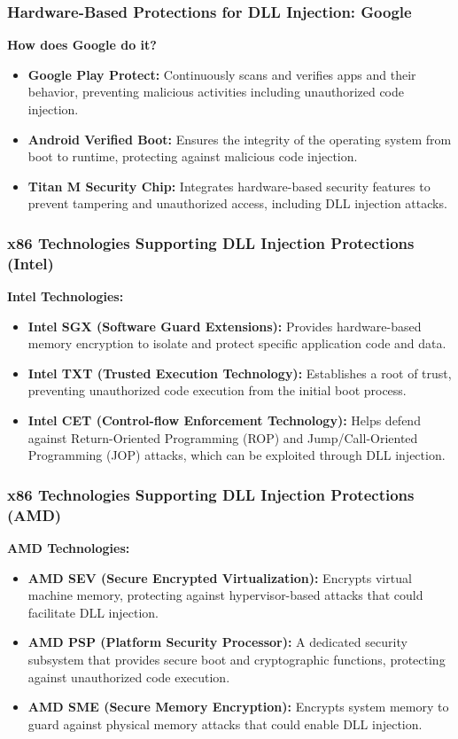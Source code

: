 \begin{frame}
    \frametitle{Hardware-Based Protections for DLL Injection: Google}
    \textbf{How does Google do it?}
    \begin{itemize}
        \item \textbf{Google Play Protect:} Continuously scans and verifies apps and their behavior, preventing malicious activities including unauthorized code injection.
        \item \textbf{Android Verified Boot:} Ensures the integrity of the operating system from boot to runtime, protecting against malicious code injection.
        \item \textbf{Titan M Security Chip:} Integrates hardware-based security features to prevent tampering and unauthorized access, including DLL injection attacks.
    \end{itemize}
\end{frame}

\begin{frame}
    \frametitle{x86 Technologies Supporting DLL Injection Protections (Intel)}
    \textbf{Intel Technologies:}
    \begin{itemize}
        \item \textbf{Intel SGX (Software Guard Extensions):} Provides hardware-based memory encryption to isolate and protect specific application code and data.
        \item \textbf{Intel TXT (Trusted Execution Technology):} Establishes a root of trust, preventing unauthorized code execution from the initial boot process.
        \item \textbf{Intel CET (Control-flow Enforcement Technology):} Helps defend against Return-Oriented Programming (ROP) and Jump/Call-Oriented Programming (JOP) attacks, which can be exploited through DLL injection.
    \end{itemize}
\end{frame}

\begin{frame}
    \frametitle{x86 Technologies Supporting DLL Injection Protections (AMD)}
    \textbf{AMD Technologies:}
    \begin{itemize}
        \item \textbf{AMD SEV (Secure Encrypted Virtualization):} Encrypts virtual machine memory, protecting against hypervisor-based attacks that could facilitate DLL injection.
        \item \textbf{AMD PSP (Platform Security Processor):} A dedicated security subsystem that provides secure boot and cryptographic functions, protecting against unauthorized code execution.
        \item \textbf{AMD SME (Secure Memory Encryption):} Encrypts system memory to guard against physical memory attacks that could enable DLL injection.
    \end{itemize}
\end{frame}

